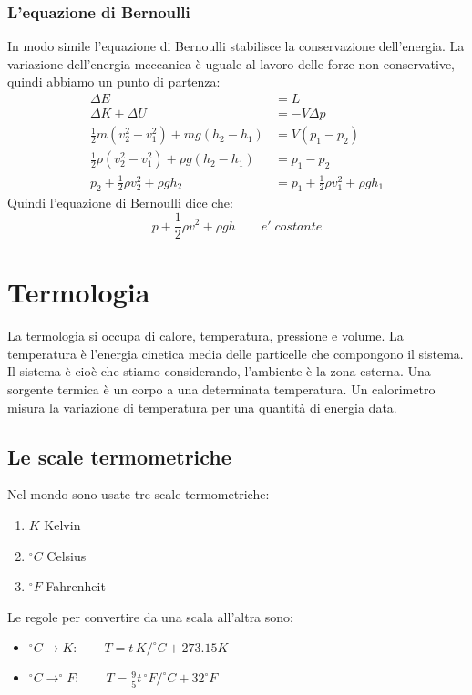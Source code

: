 \documentclass{article}
\begin{document}
\subsubsection{L'equazione di Bernoulli}
In modo simile l'equazione di Bernoulli stabilisce la conservazione dell'energia.
La variazione dell'energia meccanica è uguale al lavoro delle forze non conservative, quindi abbiamo un punto di partenza:
\begin{align*}
    \Delta E&=L \\
    \Delta K+ \Delta U&=-V\Delta p  \\
    \frac{1}{2}m(v^2_2-v^2_1)+ mg(h_2-h_1)&=V(p_1-p_2) \\
    \frac{1}{2}\rho(v^2_2-v^2_1)+ \rho g(h_2-h_1)&=p_1-p_2 \\
     p_2 + \frac{1}{2}\rho v^2_2+ \rho gh_2&=p_1 +\frac{1}{2}\rho v^2_1+ \rho gh_1
\end{align*}
Quindi l'equazione di Bernoulli dice che:
\begin{equation}
    p + \frac{1}{2}\rho v^2+ \rho gh \qquad e' \; costante
\end{equation}



\section{Termologia}
La termologia si occupa di calore, temperatura, pressione e volume. La temperatura è l'energia cinetica media delle particelle che compongono il sistema. Il sistema è cioè che stiamo considerando, l'ambiente è la zona esterna. Una sorgente termica è un corpo a una determinata temperatura. Un calorimetro misura la variazione di temperatura per una quantità di energia data.

\subsection{Le scale termometriche}
Nel mondo sono usate tre scale termometriche:
\begin{enumerate}
    \item $K$ Kelvin
    \item $^{\circ} C$ Celsius
    \item $^{\circ} F$ Fahrenheit
\end{enumerate}
Le regole per convertire da una scala all'altra sono:
\begin{itemize}
    \item $^{\circ} C \to K: \qquad T=t\,K/^{\circ}C+273.15K$
    \item $^{\circ} C \to ^{\circ} F: \qquad T=\frac{9}{5}t\,^{\circ}F/^{\circ}C+32^{\circ}F$
\end{itemize}
\end{document}
